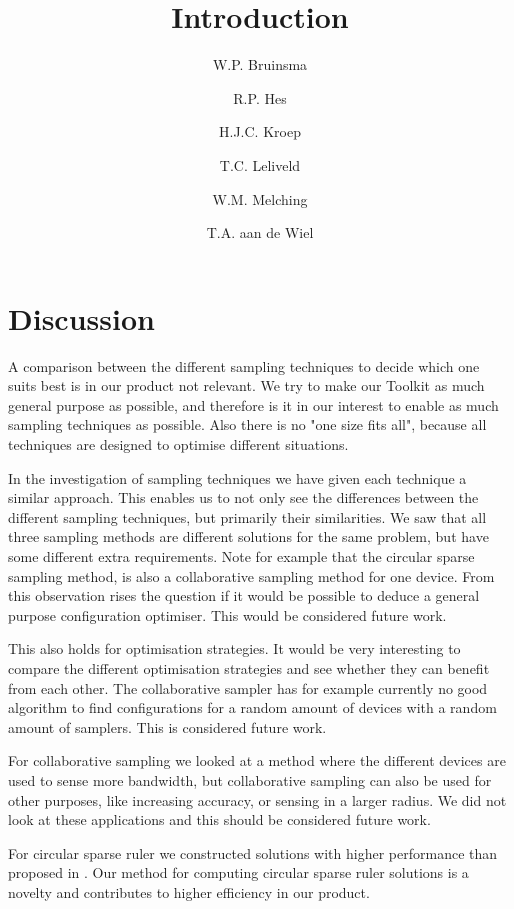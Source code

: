 \documentclass[a4paper, openany, oneside]{memoir}
\title{Introduction}
\author{W.P. Bruinsma \and R.P. Hes \and H.J.C. Kroep \and T.C. Leliveld \and W.M. Melching \and T.A. aan de Wiel}
\begin{document}
\section{Discussion}

A comparison between the different sampling techniques to decide which one suits best is in our product not relevant. We try to make our Toolkit as much general purpose as possible, and therefore is it in our interest to enable as much sampling techniques as possible. Also there is no "one size fits all", because all techniques are designed to optimise different situations.

In the investigation of sampling techniques we have given each technique a similar approach. This enables us to not only see the differences between the different sampling techniques, but primarily their similarities. We saw that all three sampling methods are different solutions for the same problem, but have some different extra requirements. Note for example that the circular sparse sampling method, is also a collaborative sampling method for one device. From this observation rises the question if it would be possible to deduce a  general purpose configuration optimiser. This would be considered future work.  

This also holds for optimisation strategies. It would be very interesting to compare the different optimisation strategies and see whether they can benefit from each other. The collaborative sampler has for example currently no good algorithm to find configurations for a random amount of devices with a random amount of samplers. This is considered future work.

For collaborative sampling we looked at a method where the different devices are used to sense more bandwidth, but collaborative sampling can also be used for other purposes, like increasing accuracy, or sensing in a larger radius. We did not look at these applications and this should be considered future work.

For circular sparse ruler we constructed solutions with higher performance than proposed in \cite{ariananda2012compressive}. Our method for computing circular sparse ruler solutions is a novelty and contributes to higher efficiency in our product.
\end{document}
